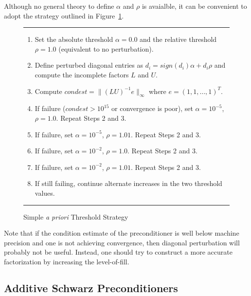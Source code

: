 Although no general theory to define $\alpha$ and $\rho$ is avaialble, 
it can be convenient to adopt the strategy
outlined in Figure~\ref{f:aprioristrategy}.
{\small
\begin{figure}
\vspace{.05in}
\hrule
\vspace{.1in}
\begin{enumerate}
\item Set the absolute threshold $\alpha = 0.0$ and the relative
threshold $\rho = 1.0$ (equivalent to no perturbation).
\item Define perturbed diagonal entries as $d_{i} = sign(d_i)\alpha +
d_i\rho$ and compute the incomplete factors $L$ and $U$.
\item Compute $condest = \|(LU)^{-1}e\|_\infty$ where $e = (1, 1,
\ldots, 1)^T$.
\item If failure ($condest > 10^{15}$ or convergence is poor), set $\alpha =
10^{-5}$, $\rho = 1.0$.  Repeat Steps 2 and 3.
\item If failure, set $\alpha =
10^{-5}$, $\rho = 1.01$. Repeat Steps 2 and 3.
\item If failure, set $\alpha =
10^{-2}$, $\rho = 1.0$. Repeat Steps 2 and 3.
\item If failure, set $\alpha =
10^{-2}$, $\rho = 1.01$. Repeat Steps 2 and 3.
\item If still failing, continue alternate increases in
   the two threshold values.
\end{enumerate}
\vspace{.1in}
\hrule
\caption{Simple {\it a priori} Threshold Strategy}
\label{f:aprioristrategy}
\end{figure}

\begin{remark}
Note that if the condition estimate of the preconditioner is
well below machine precision and one is not achieving
convergence, then diagonal perturbation will probably not be useful.
Instead, one should try to construct a more accurate factorization by
increasing the level-of-fill.
\end{remark}

\subsection{Additive Schwarz Preconditioners}
\label{sec:additive}

}
